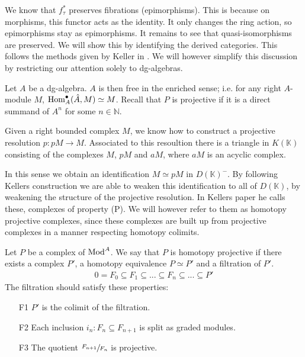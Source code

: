 \documentclass[../thesis.tex]{subfiles}
\begin{document}
            We know that $f_\tau^*$ preserves fibrations (epimorphisms). This is because on morphisms, this functor acts as the identity. It only changes the ring action, so epimorphisms stay as epimorphisms. It remains to see that quasi-isomorphisms are preserved. We will show this by identifying the derived categories. This follows the methods given by Keller in \cite{Keller94}. We will however simplify this discussion by restricting our attention solely to dg-algebras.

            Let $A$ be a dg-algebra. $A$ is then free in the enriched sense; i.e. for any right $A$-module $M$, ${\tt{Hom}}^\bullet_A(\hat{A},M) \simeq M$. Recall that $P$ is projective if it is a direct summand of $A^n$ for some $n\in \mathbb{N}$. 
            
            Given a right bounded complex $M$, we know how to construct a projective resolution $p: pM \rightarrow M$. Associated to this resoultion there is a triangle in $K(\mathbb{K})$ consisting of the complexes $M$, $pM$ and $aM$, where $aM$ is an acyclic complex.

            \begin{center}
            \end{center}

            In this sense we obtain an identification $M \simeq pM$ in $D(\mathbb{K})^-$. By following Kellers construction we are able to weaken this identification to all of $D(\mathbb{K})$, by weakening the structure of the projective resolution. In Kellers paper he calls these, complexes of property (P). We will however refer to them as homotopy projective complexes, since these complexes are built up from projective complexes in a manner respecting homotopy colimits.

            \begin{definition}
                Let $P$ be a complex of $\tt{Mod}^A$. We say that $P$ is homotopy projective if there exists a complex $P'$, a homotopy equivalence $P \simeq P'$ and a filtration of $P'$.
                \begin{align*}
                    0 = F_0 \subseteq F_1 \subseteq ... \subseteq F_n \subseteq ... \subseteq P'
                \end{align*}
                The filtration should satisfy these properties:
                \begin{itemize}
                    \item[F1] $P'$ is the colimit of the filtration.
                    \item[F2] Each inclusion $i_n : F_n \subseteq F_{n+1}$ is split as graded modules.
                    \item[F3] The quotient $\sfrac{F_{n+1}}{F_n}$ is projective.
                \end{itemize}
            \end{definition}
\end{document}
